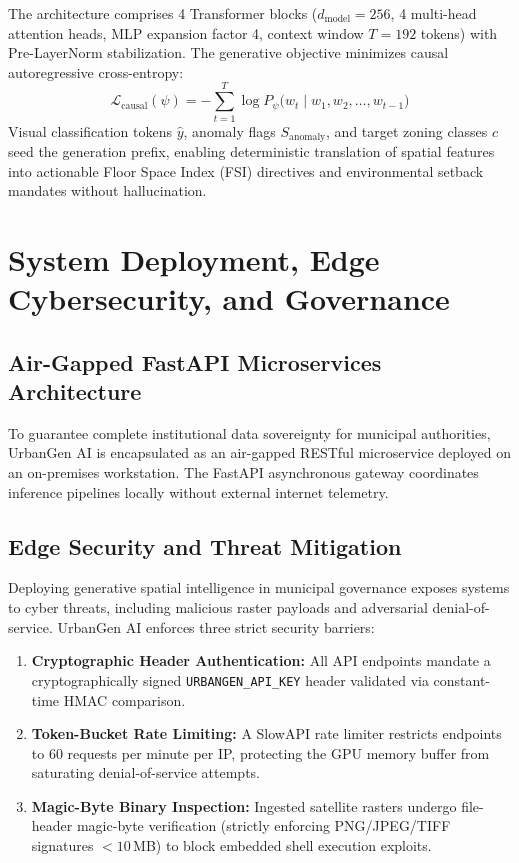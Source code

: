 \documentclass[journal]{IEEEtran}
\begin{document}
The architecture comprises 4 Transformer blocks ($d_{\text{model}} = 256$, 4 multi-head attention heads, MLP expansion factor 4, context window $T = 192$ tokens) with Pre-LayerNorm stabilization. The generative objective minimizes causal autoregressive cross-entropy:
\begin{equation}
\mathcal{L}_{\text{causal}}(\psi) = -\sum_{t=1}^{T} \log P_\psi\big(w_t \mid w_1, w_2, \dots, w_{t-1}\big)
\label{eq:causal_loss}
\end{equation}
Visual classification tokens $\hat{y}$, anomaly flags $S_{\text{anomaly}}$, and target zoning classes $c$ seed the generation prefix, enabling deterministic translation of spatial features into actionable Floor Space Index (FSI) directives and environmental setback mandates without hallucination.

\section{System Deployment, Edge Cybersecurity, and Governance}

\subsection{Air-Gapped FastAPI Microservices Architecture}
To guarantee complete institutional data sovereignty for municipal authorities, UrbanGen AI is encapsulated as an air-gapped RESTful microservice deployed on an on-premises workstation. The FastAPI asynchronous gateway coordinates inference pipelines locally without external internet telemetry.

\subsection{Edge Security and Threat Mitigation}
Deploying generative spatial intelligence in municipal governance exposes systems to cyber threats, including malicious raster payloads and adversarial denial-of-service. UrbanGen AI enforces three strict security barriers:
\begin{enumerate}
    \item \textbf{Cryptographic Header Authentication:} All API endpoints mandate a cryptographically signed \texttt{URBANGEN\_API\_KEY} header validated via constant-time HMAC comparison.
    \item \textbf{Token-Bucket Rate Limiting:} A SlowAPI rate limiter restricts endpoints to 60 requests per minute per IP, protecting the GPU memory buffer from saturating denial-of-service attempts.
    \item \textbf{Magic-Byte Binary Inspection:} Ingested satellite rasters undergo file-header magic-byte verification (strictly enforcing PNG/JPEG/TIFF signatures $< 10$\,MB) to block embedded shell execution exploits.
\end{enumerate}
\end{document}
